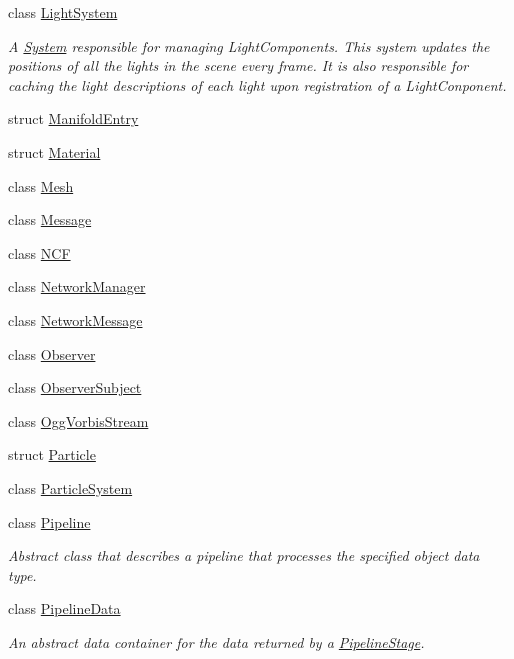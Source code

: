 \begin{DoxyCompactItemize}
class \hyperlink{class_blade_1_1_light_system}{Light\+System}
\begin{DoxyCompactList}\small\item\em A \hyperlink{class_blade_1_1_system}{System} responsible for managing Light\+Components. This system updates the positions of all the lights in the scene every frame. It is also responsible for caching the light descriptions of each light upon registration of a Light\+Conponent. \end{DoxyCompactList}\item 
struct \hyperlink{struct_blade_1_1_manifold_entry}{Manifold\+Entry}
\item 
struct \hyperlink{struct_blade_1_1_material}{Material}
\item 
class \hyperlink{class_blade_1_1_mesh}{Mesh}
\item 
class \hyperlink{class_blade_1_1_message}{Message}
\item 
class \hyperlink{class_blade_1_1_n_c_f}{N\+CF}
\item 
class \hyperlink{class_blade_1_1_network_manager}{Network\+Manager}
\item 
class \hyperlink{class_blade_1_1_network_message}{Network\+Message}
\item 
class \hyperlink{class_blade_1_1_observer}{Observer}
\item 
class \hyperlink{class_blade_1_1_observer_subject}{Observer\+Subject}
\item 
class \hyperlink{class_blade_1_1_ogg_vorbis_stream}{Ogg\+Vorbis\+Stream}
\item 
struct \hyperlink{struct_blade_1_1_particle}{Particle}
\item 
class \hyperlink{class_blade_1_1_particle_system}{Particle\+System}
\item 
class \hyperlink{class_blade_1_1_pipeline}{Pipeline}
\begin{DoxyCompactList}\small\item\em Abstract class that describes a pipeline that processes the specified object data type. \end{DoxyCompactList}\item 
class \hyperlink{class_blade_1_1_pipeline_data}{Pipeline\+Data}
\begin{DoxyCompactList}\small\item\em An abstract data container for the data returned by a \hyperlink{class_blade_1_1_pipeline_stage}{Pipeline\+Stage}. \end{DoxyCompactList}\item 

\end{DoxyCompactItemize}
